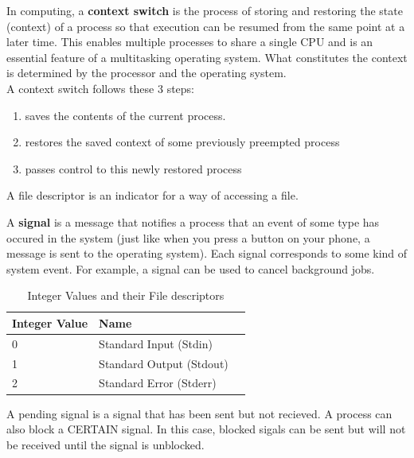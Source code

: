 \documentclass[15pt,idxtotoc,hyperref,openany]{labbook} %
\begin{document}


In computing, a {\bf context switch} is the process of storing and restoring the state (context) of a process so that execution can be resumed from the same point at a later time. This enables multiple processes to share a single CPU and is an essential feature of a multitasking operating system. What constitutes the context is determined by the processor and the operating system.\\

A context switch follows these 3 steps:

\begin{enumerate}
\item   saves the contents of the current process.
\item  restores the saved context of some previously preempted process
\item  passes control to this newly restored process
\end{enumerate}



A file descriptor is an indicator for a way of accessing a file.


A {\bf signal} is a message that notifies a process that an event of some type has occured in the system (just like when you press a button on your phone, a message is sent to the operating system).  Each signal corresponds to some kind of system event.  For example, a signal can be used to cancel background jobs.\\

\begin{table}[H]
\begin{tabular}{l l l}
\toprule
\textbf{Integer Value} & \textbf{Name}  \\
\toprule
0 & Standard Input (Stdin)\\
1 & Standard Output (Stdout) \\
2 & Standard Error (Stderr) \\
\bottomrule
\end{tabular}
\caption{Integer Values and their File descriptors}
\label{tab:treatments_xy}
\end{table}


A pending signal is a signal that has been sent but not recieved.  A process can also block a CERTAIN signal.  In this case, blocked sigals can be sent
but will not be received until the signal is unblocked.
\end{document}
